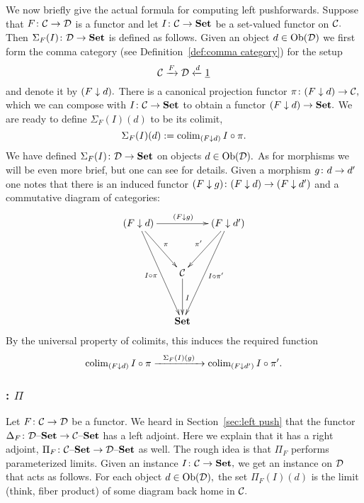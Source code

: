 \documentclass[CT4S-EN-RU]{subfiles}
\begin{document}
\begin{exerciseRUS}
\end{exerciseRUS}

\begin{blockENG}
We now briefly give the actual formula for computing left pushforwards. Suppose that $F\colon\mathcal{C}\rightarrow\mathcal{D}$ is a functor and let $I\colon\mathcal{C}\rightarrow{\mathbf{Set}}$ be a set-valued functor on $\mathcal{C}.$ Then $\Sigma_F(I)\colon\mathcal{D}\rightarrow{\mathbf{Set}}$ is defined as follows. Given an object $d\in\operatorname{Ob}(\mathcal{D})$ we first form the comma category (see Definition~\ref{def:comma category}) for the setup
$$\mathcal{C}\xrightarrow{F}\mathcal{D}\xleftarrow{d}\underline{1}$$
and denote it by $(F\downarrow d).$ There is a canonical projection functor $\pi\colon(F\downarrow d)\rightarrow\mathcal{C},$ which we can compose with $I\colon\mathcal{C}\rightarrow{\mathbf{Set}}$ to obtain a functor $(F\downarrow d)\rightarrow{\mathbf{Set}}.$ We are ready to define $\Sigma_F(I)(d)$ to be its colimit,
$$\Sigma_F(I)(d):=\operatorname{colim}_{(F\downarrow d)}I\circ\pi.$$
We have defined $\Sigma_F(I)\colon\mathcal{D}\rightarrow{\mathbf{Set}}$ on objects $d\in\operatorname{Ob}(\mathcal{D}).$ As for morphisms we will be even more brief, but one can see \cite{Sp1} for details. Given a morphism $g\colon d\rightarrow d'$ one notes that there is an induced functor $(F\downarrow g)\colon (F\downarrow d)\rightarrow(F\downarrow d')$ and a commutative diagram of categories:
$$
\xymatrix@=15pt{
(F\down d)\ar[rr]^{(F\down g)}\ar[ddr]^{\pi}\ar[ddddr]_{I\circ\pi}&&(F\down d')\ar[ddl]_{\pi'}\ar[ddddl]^{I\circ\pi'}\\\\
&\mcC\ar[dd]^I\\\\
&\Set
}
$$
By the universal property of colimits, this induces the required function $$\operatorname{colim}_{(F\downarrow d)}I\circ\pi\xrightarrow{\ \ \Sigma_F(I)(g)\ \ }\operatorname{colim}_{(F\downarrow d')}I\circ\pi'.$$
\end{blockENG}

\begin{blockRUS}
\end{blockRUS}


\subsubsection{: \texorpdfstring{$\Pi$}{Π}}

\begin{blockENG}
Let $F\colon\mathcal{C}\rightarrow\mathcal{D}$ be a functor. We heard in Section~\ref{sec:left push} that the functor $\Delta_F\colon\mathcal{D}{\text \textendash}{\mathbf{Set}}\rightarrow\mathcal{C}{\text \textendash}{\mathbf{Set}}$ has a left adjoint. Here we explain that it has a right adjoint, $\Pi_F\colon\mathcal{C}{\text \textendash}{\mathbf{Set}}\rightarrow\mathcal{D}{\text \textendash}{\mathbf{Set}}$ as well. The rough idea is that $\Pi_F$ performs parameterized limits. Given an instance $I\colon\mathcal{C}\rightarrow{\mathbf{Set}},$ we get an instance on $\mathcal{D}$ that acts as follows. For each object $d\in\operatorname{Ob}(\mathcal{D}),$ the set $\Pi_F(I)(d)$ is the limit (think, fiber product) of some diagram back home in $\mathcal{C}.$ 
\end{blockENG}
\end{document}
